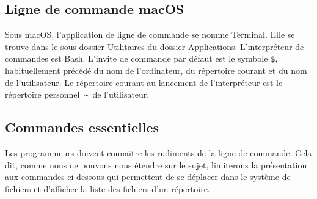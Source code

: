 \subsection{Ligne de commande macOS}
\label{sec:informatique:cli:macos}

Sous macOS, l'application de ligne de commande se nomme
Terminal. Elle se trouve dans le sous-dossier
Utilitaires du dossier Applications. L'interpréteur de commandes est
Bash. L'invite de commande par défaut est le symbole
\verb=$=, habituellement précédé du nom de l'ordinateur, du répertoire
courant et du nom de l'utilisateur. Le répertoire courant au lancement
de l'interpréteur est le répertoire personnel \,\verb=~=\, de
l'utilisateur.


\subsection{Commandes essentielles}
\label{sec:informatique:cli:commandes}

Les programmeurs doivent connaitre les rudiments de la ligne de
commande. Cela dit, comme nous ne pouvons nous étendre sur le sujet,
limiterons la présentation aux commandes ci-dessous qui
permettent de se déplacer dans le système de fichiers et d'afficher
la liste des fichiers d'un répertoire.


